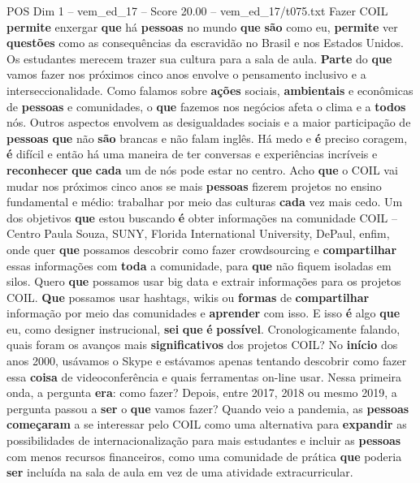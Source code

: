 \begin{textsample}{POS Dim 1 – vem\_ed\_17 – Score 20.00 – vem\_ed\_17/t075.txt}  \label{ex:f1_pos_131}
Fazer COIL \textbf{permite} enxergar \textbf{que} há \textbf{pessoas} no mundo \textbf{que} \textbf{são} como eu, \textbf{permite} ver \textbf{questões} como as consequências da escravidão no Brasil e nos Estados Unidos.
Os estudantes merecem trazer sua cultura para a sala de aula. \textbf{Parte} do \textbf{que} vamos fazer nos próximos cinco anos envolve o pensamento inclusivo e a interseccionalidade.
Como falamos sobre \textbf{ações} sociais, \textbf{ambientais} e econômicas de \textbf{pessoas} e comunidades, o \textbf{que} fazemos nos negócios afeta o clima e a \textbf{todos} nós.
Outros aspectos envolvem as desigualdades sociais e a maior participação de \textbf{pessoas} \textbf{que} não \textbf{são} brancas e não falam inglês.
Há medo e \textbf{é} preciso coragem, \textbf{é} difícil e então há uma maneira de ter conversas e experiências incríveis e \textbf{reconhecer} \textbf{que} \textbf{cada} um de nós pode estar no centro.
Acho \textbf{que} o COIL vai mudar nos próximos cinco anos se mais \textbf{pessoas} fizerem projetos no ensino fundamental e médio: trabalhar por meio das culturas \textbf{cada} vez mais cedo.
Um dos objetivos \textbf{que} estou buscando \textbf{é} obter informações na comunidade COIL – Centro Paula Souza, SUNY, Florida International University, DePaul, enfim, onde quer \textbf{que} possamos descobrir como fazer crowdsourcing e \textbf{compartilhar} essas informações com \textbf{toda} a comunidade, para \textbf{que} não fiquem isoladas em silos.
Quero \textbf{que} possamos usar big data e extrair informações para os projetos COIL. \textbf{Que} possamos usar hashtags, wikis ou \textbf{formas} de \textbf{compartilhar} informação por meio das comunidades e \textbf{aprender} com isso.
E isso \textbf{é} algo \textbf{que} eu, como designer instrucional, \textbf{sei} \textbf{que} \textbf{é} \textbf{possível}.
Cronologicamente falando, quais foram os avanços mais \textbf{significativos} dos projetos COIL?
No \textbf{início} dos anos 2000, usávamos o Skype e estávamos apenas tentando descobrir como fazer essa \textbf{coisa} de videoconferência e quais ferramentas on-line usar.
Nessa primeira onda, a pergunta \textbf{era}: como fazer?
Depois, entre 2017, 2018 ou mesmo 2019, a pergunta passou a \textbf{ser} o \textbf{que} vamos fazer?
Quando veio a pandemia, as \textbf{pessoas} \textbf{começaram} a se interessar pelo COIL como uma alternativa para \textbf{expandir} as possibilidades de internacionalização para mais estudantes e incluir as \textbf{pessoas} com menos recursos financeiros, como uma comunidade de prática \textbf{que} poderia \textbf{ser} incluída na sala de aula em vez de uma atividade extracurricular.

\end{textsample}
